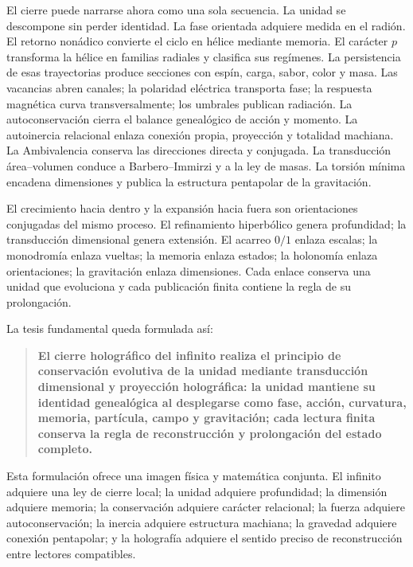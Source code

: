 El cierre puede narrarse ahora como una sola secuencia. La unidad se descompone sin perder identidad. La fase orientada adquiere medida en el radión. El retorno nonádico convierte el ciclo en hélice mediante memoria. El carácter \(p\) transforma la hélice en familias radiales y clasifica sus regímenes. La persistencia de esas trayectorias produce secciones con espín, carga, sabor, color y masa. Las vacancias abren canales; la polaridad eléctrica transporta fase; la respuesta magnética curva transversalmente; los umbrales publican radiación. La autoconservación cierra el balance genealógico de acción y momento. La autoinercia relacional enlaza conexión propia, proyección y totalidad machiana. La Ambivalencia conserva las direcciones directa y conjugada. La transducción área–volumen conduce a Barbero–Immirzi y a la ley de masas. La torsión mínima encadena dimensiones y publica la estructura pentapolar de la gravitación.

El crecimiento hacia dentro y la expansión hacia fuera son orientaciones conjugadas del mismo proceso. El refinamiento hiperbólico genera profundidad; la transducción dimensional genera extensión. El acarreo \(0/1\) enlaza escalas; la monodromía enlaza vueltas; la memoria enlaza estados; la holonomía enlaza orientaciones; la gravitación enlaza dimensiones. Cada enlace conserva una unidad que evoluciona y cada publicación finita contiene la regla de su prolongación.

La tesis fundamental queda formulada así:

\begin{quote}
\textbf{El cierre holográfico del infinito realiza el principio de conservación evolutiva de la unidad mediante transducción dimensional y proyección holográfica: la unidad mantiene su identidad genealógica al desplegarse como fase, acción, curvatura, memoria, partícula, campo y gravitación; cada lectura finita conserva la regla de reconstrucción y prolongación del estado completo.}
\end{quote}

Esta formulación ofrece una imagen física y matemática conjunta. El infinito adquiere una ley de cierre local; la unidad adquiere profundidad; la dimensión adquiere memoria; la conservación adquiere carácter relacional; la fuerza adquiere autoconservación; la inercia adquiere estructura machiana; la gravedad adquiere conexión pentapolar; y la holografía adquiere el sentido preciso de reconstrucción entre lectores compatibles.
